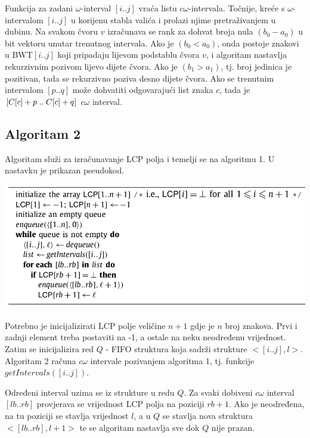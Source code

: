\documentclass[times, utf8, seminar, numeric]{fer}
\begin{document}
Funkcija za zadani $\omega$-interval $[i..j]$ vraća listu $c\omega$-intervala. Točnije, kreće s $\omega$-intervalom $[i..j]$ u korijenu stabla valića i prolazi njime pretraživanjem u dubinu.
Na svakom čvoru $v$ izračunava se rank za dohvat broja nula $(b_{0}-a_{0})$ u bit vektoru unutar trenutnog intervala. Ako je $(b_{0}<a_{0})$, onda postoje znakovi u BWT$[i..j]$ koji pripadaju lijevom podstablu čvora $v$, i algoritam nastavlja rekurzivnim pozivom lijevo dijete čvora. Ako je $(b_{1} > a_{1})$, tj. broj jedinica je pozitivan, tada se rekurzivno poziva desno dijete čvora. Ako se trenutnim intervalom $[p .. q]$ može dohvatiti odgovarajući list znaka $c$, tada je $[C[c] + p \hspace{1mm} ..\hspace{1mm} C[c] + q]$ $c\omega$ interval. 

\subsection{Algoritam 2}

Algoritam služi za izračunavanje LCP polja i temelji se na algoritmu 1. U nastavku je prikazan pseudokod.

\begin{center}
	\includegraphics[scale=0.46]{slike/algorithm_2.png}
	\label{alg2}
\end{center}

Potrebno je inicijalizirati LCP polje veličine $n+1$ gdje je $n$ broj znakova. Prvi i zadnji element treba postaviti na -1, a ostale na neku neodređenu vrijednost. Zatim se inicijalizira red $Q$ - FIFO struktura koja sadrži strukture $<[i..j], l>$. Algoritam 2 računa $c\omega$ intervale pozivanjem algoritma 1, tj. funkcije $getIntervals([i..j])$.

Određeni interval uzima se iz strukture u redu $Q$. Za svaki dobiveni $c\omega$ interval $[lb..rb]$ provjerava se vrijednost LCP polja na poziciji $rb + 1$. Ako je neodređena, na tu poziciji se stavlja vrijednost $l$, a u $Q$ se stavlja nova struktura $<[lb..rb], l+1>$ te se algoritam nastavlja sve dok $Q$ nije prazan.
\end{document}
